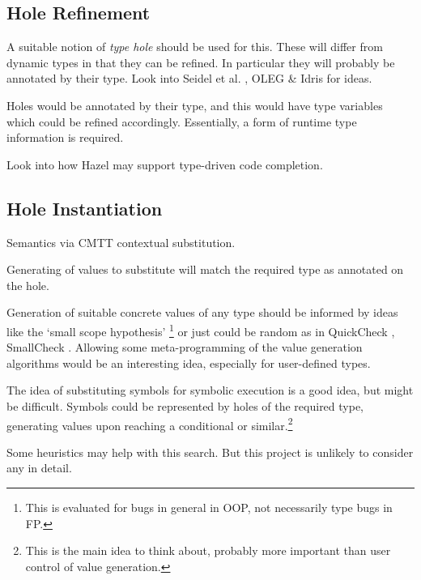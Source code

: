 \subsection{Hole Refinement}
A suitable notion of \textit{type hole} should be used for this. These will differ from dynamic types in that they can be refined. In particular they will probably be annotated by their type. Look into Seidel et al. \cite{SearchProc}, OLEG \cite[chapter~2]{OLEG} \& Idris for ideas.\par 
Holes would be annotated by their type, and this would have type variables which could be refined accordingly. Essentially, a form of runtime type information is required.\par 
Look into how Hazel may support type-driven code completion. 

\subsection{Hole Instantiation}
Semantics via CMTT contextual substitution.\par 
Generating of values to substitute will match the required type as annotated on the hole.\par
Generation of suitable concrete values of any type should be informed by ideas like the `small scope hypothesis' \cite{SmallScope}\footnote{This is evaluated for bugs in general in OOP, not necessarily type bugs in FP.} or just could be random as in QuickCheck \cite{QuickCheck}, SmallCheck \cite{SmallCheck}. Allowing some meta-programming of the value generation algorithms would be an interesting idea, especially for user-defined types.\par
The idea of substituting symbols for symbolic execution is a good idea, but might be difficult. Symbols could be represented by holes of the required type, generating values upon reaching a conditional or similar.\footnote{This is the main idea to think about, probably more important than user control of value generation.} \par 
Some heuristics may help with this search. But this project is unlikely to consider any in detail.

